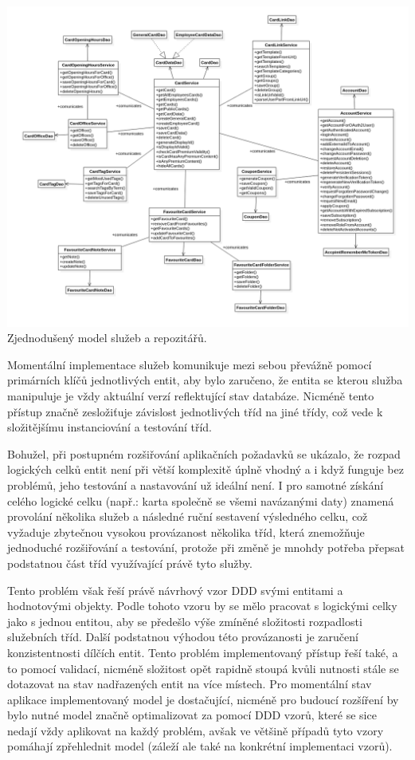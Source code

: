 \begin{itemize}
\begin{itemize}
		\includegraphics[width=0.24\linewidth]{obrazky/sluzby_a_repozitare}\hfill
		Zjednodušený model služeb a repozitářů. %

		Momentální implementace služeb komunikuje mezi sebou převážně pomocí primárních klíčů jednotlivých entit, aby
		bylo zaručeno, že entita se kterou služba manipuluje je vždy aktuální verzí reflektující stav databáze.
		Nicméně tento přístup značně zesložiťuje závislost jednotlivých tříd na jiné třídy, což vede k složitějšímu
		instanciování a testování tříd.

		Bohužel, při postupném rozšiřování aplikačních požadavků se ukázalo, že rozpad logických celků entit není při větší
		komplexitě úplně vhodný a i když funguje bez problémů, jeho testování a nastavování už ideální není.
		I pro samotné získání celého logické celku (např.: karta společně se všemi navázanými daty) znamená provolání
		několika služeb a následné ruční sestavení výsledného celku, což vyžaduje zbytečnou vysokou provázanost několika tříd,
		která znemožňuje jednoduché rozšiřování a testování, protože při změně je mnohdy potřeba přepsat podstatnou část
		tříd využívající právě tyto služby.

		Tento problém však řeší právě návrhový vzor \ac{DDD} svými entitami a hodnotovými objekty.
		Podle tohoto vzoru by se mělo pracovat s logickými celky jako s jednou entitou, aby se předešlo výše zmíněné složitosti
		rozpadlosti služebních tříd.
		Další podstatnou výhodou této provázanosti je zaručení konzistentnosti dílčích entit.
		Tento problém implementovaný přístup řeší také, a to pomocí validací, nicméně složitost opět rapidně stoupá kvůli
		nutnosti stále se dotazovat na stav nadřazených entit na více místech.
		\cite{ddd_quickly}
		Pro momentální stav aplikace implementovaný model je dostačující, nicméně pro budoucí rozšíření by bylo nutné
		model značně optimalizovat za pomocí \ac{DDD} vzorů, které se sice nedají vždy aplikovat na každý problém, avšak
		ve většině případů tyto vzory pomáhají zpřehlednit model (záleží ale také na konkrétní implementaci vzorů).




\end{itemize}
\end{itemize}
